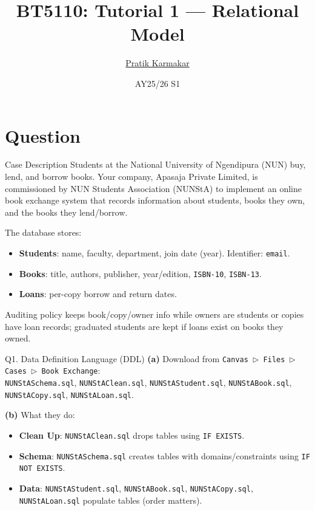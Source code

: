 \documentclass{beamer}
\title{BT5110: Tutorial 1 — Relational Model}
\author{\href{https://pratik2358.github.io/}{Pratik Karmakar}}
\institute{School of Computing,\\ National University of Singapore}
\date{AY25/26 S1}
\begin{document}
\begin{frame}
  \titlepage
\end{frame}
\section{Question}

\begin{frame}{Case Description}
Students at the National University of Ngendipura (NUN) buy, lend, and borrow books.
Your company, Apasaja Private Limited, is commissioned by NUN Students Association (NUNStA) to implement an online book exchange system that records information about students, books they own, and the books they lend/borrow.

The database stores:
\begin{itemize}
  \item \textbf{Students}: name, faculty, department, join date (year). Identifier: \texttt{email}.
  \item \textbf{Books}: title, authors, publisher, year/edition, \texttt{ISBN-10}, \texttt{ISBN-13}.
  \item \textbf{Loans}: per-copy borrow and return dates.
\end{itemize}
Auditing policy keeps book/copy/owner info while owners are students or copies have loan records;
graduated students are kept if loans exist on books they owned.
\end{frame}

\begin{frame}{Q1. Data Definition Language (DDL)}
\textbf{(a)} Download from \texttt{Canvas $\triangleright$ Files $\triangleright$ Cases $\triangleright$ Book Exchange}:\\
\texttt{NUNStASchema.sql}, \texttt{NUNStAClean.sql}, \texttt{NUNStAStudent.sql}, \texttt{NUNStABook.sql}, \texttt{NUNStACopy.sql}, \texttt{NUNStALoan.sql}.
\vspace{0.5em}

\textbf{(b)} What they do:
\begin{itemize}
  \item \textbf{Clean Up}: \texttt{NUNStAClean.sql} drops tables using \texttt{IF EXISTS}.
  \item \textbf{Schema}: \texttt{NUNStASchema.sql} creates tables with domains/constraints using \texttt{IF NOT EXISTS}.
  \item \textbf{Data}: \texttt{NUNStAStudent.sql}, \texttt{NUNStABook.sql}, \texttt{NUNStACopy.sql}, \texttt{NUNStALoan.sql} populate tables (order matters).
\end{itemize}
\end{frame}
\end{document}
